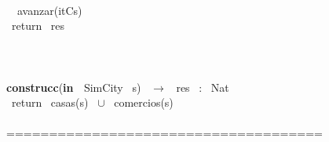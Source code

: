 \\\indent \ \indent \ avanzar(itCs)
\\\indent \ return \ res
\\\noindent\makebox[\linewidth]{\rule{\textwidth}{0.4pt}}
\\
\\\noindent\makebox[\linewidth]{\rule{\textwidth}{0.4pt}}
\\\textbf{construcc}(\textbf{in \ }SimCity \ s) \ $\rightarrow $ \ res \ : \ Nat
\\\indent \ return \ casas(s) \ $\cup$ \ comercios(s)
\\\noindent\makebox[\linewidth]{\rule{\textwidth}{0.4pt}}
\\===================================== \ 
\\
\\
\\
\\
